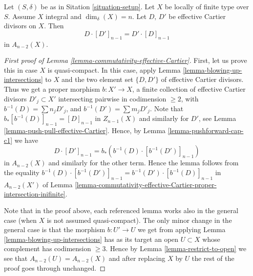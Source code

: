\begin{lemma}
\label{lemma-commutativity-effective-Cartier}
Let $(S, \delta)$ be as in Sitation \ref{situation-setup}.
Let $X$ be locally of finite type over $S$.
Assume $X$ integral and $\dim_\delta(X) = n$.
Let $D$, $D'$ be effective Cartier divisors on $X$.
Then
$$
D \cdot [D']_{n - 1} = D' \cdot [D]_{n - 1}
$$
in $A_{n - 2}(X)$.
\end{lemma}

\begin{proof}[First proof of Lemma \ref{lemma-commutativity-effective-Cartier}]
First, let us prove this in case $X$ is quasi-compact.
In this case, apply Lemma \ref{lemma-blowing-up-intersections} to $X$ and the
two element set $\{D, D'\}$ of effective Cartier divisors.
Thus we get a proper morphism $b : X' \to X$,
a finite collection of effective Cartier
divisors $D'_j \subset X'$ intersecting pairwise in codimension $\geq 2$,
with $b^{-1}(D) = \sum n_j D'_j$, and $b^{-1}(D') = \sum m_j D'_j$.
Note that $b_*[b^{-1}(D)]_{n - 1} = [D]_{n - 1}$ in $Z_{n - 1}(X)$
and similarly for $D'$,
see Lemma \ref{lemma-push-pull-effective-Cartier}.
Hence, by Lemma \ref{lemma-pushforward-cap-c1} we have
$$
D \cdot [D']_{n - 1} = b_*\left(b^{-1}(D) \cdot [b^{-1}(D')]_{n - 1}\right)
$$
in $A_{n - 2}(X)$ and similarly for the other term. Hence the
lemma follows from the equality
$b^{-1}(D) \cdot [b^{-1}(D')]_{n - 1} = b^{-1}(D') \cdot [b^{-1}(D)]_{n - 1}$
in $A_{n - 2}(X')$ of Lemma
\ref{lemma-commutativity-effective-Cartier-proper-intersection-inifinite}.

\medskip\noindent
Note that in the proof above, each referenced lemma works also
in the general case (when $X$ is not assumed quasi-compact). The
only minor change in the general case is that the morphism
$b : U' \to U$ we get from applying Lemma \ref{lemma-blowing-up-intersections}
has as its target
an open $U \subset X$ whose complement has codimension $\geq 3$.
Hence by Lemma \ref{lemma-restrict-to-open} we see that
$A_{n - 2}(U) = A_{n - 2}(X)$
and after replacing $X$ by $U$ the rest of the proof goes through
unchanged.
\end{proof}

